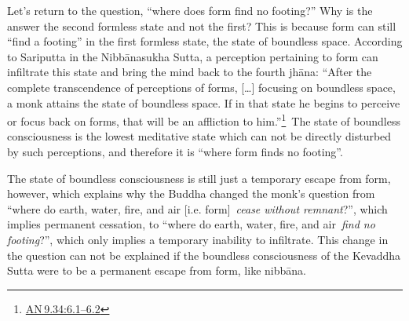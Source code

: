 \documentclass[10pt, openany]{book}
\begin{document}
Let's return to the question, “where does form find no footing?” Why is the answer the second formless state and not the first? This is because form can still “find a footing” in the first formless state, the state of boundless space. According to Sariputta in the Nibbānasukha Sutta, a perception pertaining to form can infiltrate this state and bring the mind back to the fourth jhāna: “After the complete transcendence of perceptions of forms, […] focusing on boundless space, a monk attains the state of boundless space. If in that state he begins to perceive or focus back on forms, that will be an affliction to him.”\footnote {\href{https://suttacentral.net/an9.34/en/sujato\#6.1}{AN 9.34:6.1–6.2}} The state of boundless consciousness is the lowest meditative state which can not be directly disturbed by such perceptions, and therefore it is “where form finds no footing”.


The state of boundless consciousness is still just a temporary escape from form, however, which explains why the Buddha changed the monk's question from “where do earth, water, fire, and air [i.e. form] \textit{cease without remnant}?”, which implies permanent cessation, to “where do earth, water, fire, and air \textit{find no footing}?”, which only implies a temporary inability to infiltrate. This change in the question can not be explained if the boundless consciousness of the Kevaddha Sutta were to be a permanent escape from form, like nibbāna.
\end{document}

